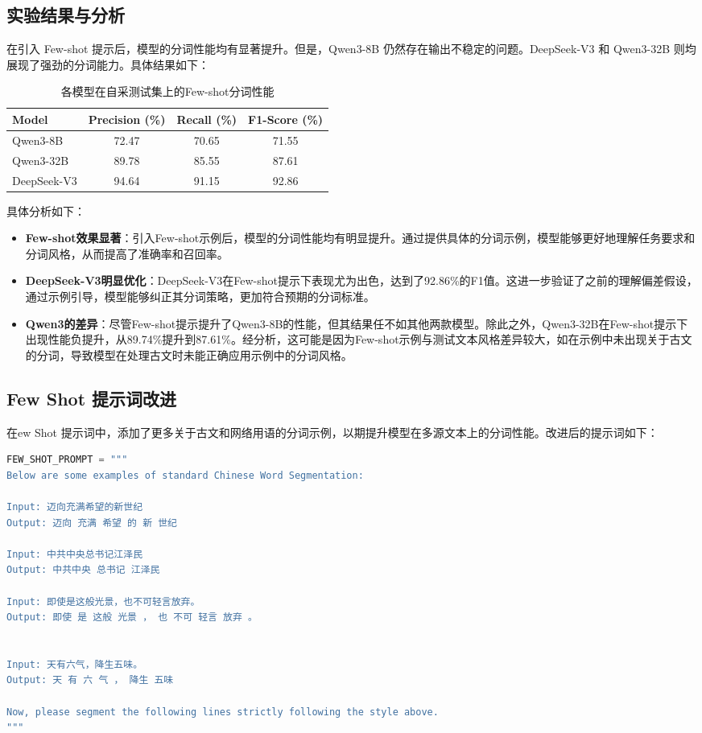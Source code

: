 \documentclass[a4paper,12pt]{ctexart} %
\begin{document}
\subsection{实验结果与分析}
在引入 Few-shot 提示后，模型的分词性能均有显著提升。但是，Qwen3-8B 仍然存在输出不稳定的问题。DeepSeek-V3 和 Qwen3-32B 则均展现了强劲的分词能力。具体结果如下：
\begin{table}[H]
    \centering
    \caption{各模型在自采测试集上的Few-shot分词性能}
    \label{tab:few_shot_result}
    \begin{tabular}{l c c c}
        \toprule
        \textbf{Model} & \textbf{Precision (\%)} & \textbf{Recall (\%)} & \textbf{F1-Score (\%)} \\
        \midrule
        Qwen3-8B      & 72.47 & 70.65 & 71.55 \\
        Qwen3-32B     & 89.78 & 85.55 & 87.61 \\
        DeepSeek-V3   & 94.64 & 91.15 & 92.86 \\
        \bottomrule
    \end{tabular}
\end{table}
具体分析如下：
\begin{itemize}
    \item \textbf{Few-shot效果显著}：引入Few-shot示例后，模型的分词性能均有明显提升。通过提供具体的分词示例，模型能够更好地理解任务要求和分词风格，从而提高了准确率和召回率。
    \item \textbf{DeepSeek-V3明显优化}：DeepSeek-V3在Few-shot提示下表现尤为出色，达到了92.86\%的F1值。这进一步验证了之前的理解偏差假设，通过示例引导，模型能够纠正其分词策略，更加符合预期的分词标准。
    \item \textbf{Qwen3的差异}：尽管Few-shot提示提升了Qwen3-8B的性能，但其结果任不如其他两款模型。除此之外，Qwen3-32B在Few-shot提示下出现性能负提升，从89.74\%提升到87.61\%。经分析，这可能是因为Few-shot示例与测试文本风格差异较大，如在示例中未出现关于古文的分词，导致模型在处理古文时未能正确应用示例中的分词风格。
\end{itemize}
\subsection{Few Shot 提示词改进}
在ew Shot 提示词中，添加了更多关于古文和网络用语的分词示例，以期提升模型在多源文本上的分词性能。改进后的提示词如下：
\begin{lstlisting}[language=Python]
FEW_SHOT_PROMPT = """
Below are some examples of standard Chinese Word Segmentation:

Input: 迈向充满希望的新世纪
Output: 迈向 充满 希望 的 新 世纪

Input: 中共中央总书记江泽民
Output: 中共中央 总书记 江泽民

Input: 即使是这般光景，也不可轻言放弃。
Output: 即使 是 这般 光景 ， 也 不可 轻言 放弃 。


Input: 天有六气，降生五味。
Output: 天 有 六 气 ， 降生 五味

Now, please segment the following lines strictly following the style above.
"""
\end{lstlisting}
\end{document}
